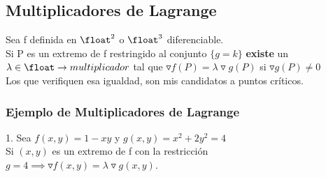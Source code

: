 \documentclass[10pt,a4paper]{article}
\begin{document}
\subsection*{Multiplicadores de Lagrange}
Sea f definida en $\float^{2}$ o $\float^{3}$ diferenciable. \\
Si P es un extremo de f restringido al conjunto $\{g = k\}$ \textbf{existe} un $\lambda \in \float \rightarrow multiplicador$ tal que $\triangledown f(P) = \lambda \triangledown g(P)$ si $\triangledown g(P) \neq 0$ \\
Los que verifiquen esa igualdad, son mis candidatos a puntos críticos.   
\subsubsection*{Ejemplo de Multiplicadores de Lagrange}
1. Sea $f(x,y) = 1-xy$ y $g(x,y) = x^{2} + 2y^{2} = 4$ \\
Si $(x,y)$ es un extremo de f con la restricción $g = 4 \implies \triangledown f(x,y) = \lambda \triangledown g(x,y)$. 
\end{document}
